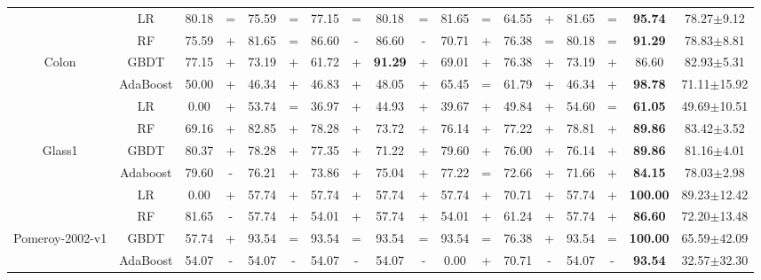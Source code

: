 \documentclass[journal]{IEEEtran}
\begin{document}
\begin{table*}
\begin{threeparttable}
\begin{tabular}{|c|c|cc|cc|cc|cc|cc|cc|cc|cc|}
			&LR & 80.18  &=     &75.59  &=     &77.15  &=    & 80.18  &=    & 81.65  &=     & 64.55  & +       & 81.65  &=       & \textbf{95.74}   &78.27$\pm$9.12  \\
			& RF &75.59  & +     &81.65  &=     &86.60  &-     &86.60  &-    &70.71  & +     &76.38  &=     &80.18  &=    & \textbf{91.29} &78.83$\pm$8.81 \\
			Colon
			& GBDT &77.15  & +     &73.19 & +     &61.72  & +     &\textbf{91.29}  & +     &69.01 & +     &76.38 & +     &73.19  & +     & 86.60 & 82.93$\pm$5.31 \\
			& AdaBoost & 50.00  & +     & 46.34  & +     & 46.83  & +     & 48.05  & +     & 65.45  & =     & 61.79  & +     & 46.34  & +     & \textbf{98.78} & 71.11$\pm$15.92 \\
			\hline
			
			& LR & 0.00  & +     & 53.74  & =     & 36.97  & +     & 44.93  & +     & 39.67  & +     & 49.84  & +     & 54.60  & =     &\textbf{61.05}  & 49.69$\pm$10.51  \\
			& RF    & 69.16  & +     & 82.85  & +     & 78.28  & +     & 73.72  & +     & 76.14  & +     & 77.22  & +     & 78.81  & +     &\textbf{89.86}  & 83.42$\pm$3.52  \\
			Glass1
			& GBDT  & 80.37  & +     & 78.28  & +     & 77.35  & +     & 71.22  & +     & 79.60  & +     & 76.00  & +     & 76.14  & +     &\textbf{89.86}  & 81.16$\pm$4.01  \\
			& Adaboost & 79.60  & -     & 76.21  & +     & 73.86  & +     & 75.04  & +     & 77.22  & =     & 72.66  & +     & 71.66  & +     &\textbf{84.15}  & 78.03$\pm$2.98  \\
			\hline
			
			&LR &0.00  & +     &57.74  & +      &57.74  & +    &57.74  & +      &57.74  & +      &70.71  & +    &57.74  & +      & \textbf{100.00}  & 89.23$\pm$12.42  \\
			&RF &81.65  &-     &57.74 & +     &54.01  & +     &57.74  & +     &54.01  & +     &61.24  & +      &57.74  & +     & \textbf{86.60} & 72.20$\pm$13.48 \\
			Pomeroy-2002-v1
			& GBDT &57.74  & +     &93.54  &=     &93.54  &=     &93.54  &=    &93.54  &=     &76.38 & +     &93.54  &=     & \textbf{100.00} &65.59$\pm$42.09 \\
			& AdaBoost &54.07  &-     &54.07  &-     &54.07  &-     &54.07  &-     &0.00  &+     &70.71  &-     &54.07  &-     & \textbf{93.54} &32.57$\pm$32.30 \\
			\hline
			

\end{tabular}
\end{threeparttable}
\end{table*}
\end{document}
